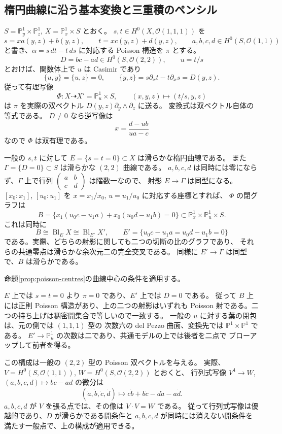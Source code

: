 \subsection{楕円曲線に沿う基本変換と三重積のペンシル}
$S=\mathbb P^1_y\times\mathbb P^1_z$, $X=\mathbb P^1_x\times S$ とおく。
$s,t\in H^0(X,\mathcal O(1,1,1))$ を
\[
 s=xa(y,z)+b(y,z),\qquad t=xc(y,z)+d(y,z),\qquad
 a,b,c,d\in H^0(S,\mathcal O(1,1))
\]
と書き、$\alpha=s\,dt-t\,ds$ に対応する Poisson 構造を $\pi$ とする。
\[
 D=bc-ad\in H^0(S,\mathcal O(2,2)),\qquad u=t/s
\]
とおけば、関数体上で $u$ は Casimir であり
\[
 \{u,y\}=\{u,z\}=0,\qquad
 \{y,z\}=s\partial_xt-t\partial_xs=D(y,z).
\]
従って有理写像
\[
 \Phi\colon X\dashrightarrow X'=\mathbb P^1_u\times S,
 \qquad (x,y,z)\longmapsto(t/s,y,z)
\]
は $\pi$ を実際の双ベクトル $D(y,z)\partial_y\wedge\partial_z$ に送る。
変換式は双ベクトル自体の等式である。
$D\ne0$ なら逆写像は
\[
 x=\frac{d-ub}{ua-c}
\]
なので $\Phi$ は双有理である。

一般の $s,t$ に対して $E=\{s=t=0\}\subset X$ は滑らかな楕円曲線である。
また $\Gamma=\{D=0\}\subset S$ は滑らかな $(2,2)$ 曲線である。
$a,b,c,d$ は同時には零にならず、$\Gamma$ 上で行列
$\left(\begin{smallmatrix}a&b\\c&d\end{smallmatrix}\right)$ は階数一なので、
射影 $E\to\Gamma$ は同型になる。
$[x_0:x_1]$, $[u_0:u_1]$ を $x=x_1/x_0$, $u=u_1/u_0$ に対応する座標とすれば、
$\Phi$ の閉グラフは
\[
 B=\{x_1(u_0c-u_1a)+x_0(u_0d-u_1b)=0\}
 \subset\mathbb P^1_x\times\mathbb P^1_u\times S.
\]
これは同時に
\[
 B\cong\operatorname{Bl}_{E}X
 \cong\operatorname{Bl}_{E'}X',\qquad
 E'=\{u_0c-u_1a=u_0d-u_1b=0\}
\]
である。実際、どちらの射影に関しても二つの切断の比のグラフであり、
それらの共通零点は滑らかな余次元二の完全交叉である。
同様に $E'\to\Gamma$ は同型で、$B$ は滑らかである。

命題\ref{prop:poisson-centres}の曲線中心の条件を適用する。

$E$ 上では $s=t=0$ より $\pi=0$ であり、$E'$ 上では $D=0$ である。
従って $B$ 上には正則 Poisson 構造があり、上の二つの射影はいずれも
Poisson 射である。二つの持ち上げは稠密開集合で等しいので一致する。
一般の $u$ に対する葉の閉包は、元の側では $(1,1,1)$ 型の
次数六の del Pezzo 曲面、変換先では $\mathbb P^1\times\mathbb P^1$ である。
$E'\to\mathbb P^1_u$ の次数は二であり、共通モデルの上では後者を二点で
ブローアップして前者を得る。

この構成は一般の $(2,2)$ 型の Poisson 双ベクトルを与える。
実際、$V=H^0(S,\mathcal O(1,1))$, $W=H^0(S,\mathcal O(2,2))$ とおくと、
行列式写像 $V^4\to W$, $(a,b,c,d)\mapsto bc-ad$ の微分は
\[
 (\dot a,\dot b,\dot c,\dot d)\longmapsto
 c\dot b+b\dot c-d\dot a-a\dot d.
\]
$a,b,c,d$ が $V$ を張る点では、その像は $V\cdot V=W$ である。
従って行列式写像は優越的であり、$D$ が滑らかである開条件と
$a,b,c,d$ が同時には消えない開条件を満たす一般点で、上の構成が適用できる。

